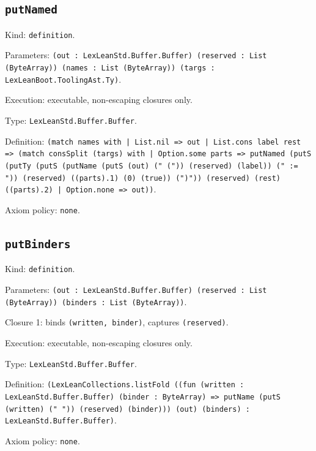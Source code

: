 \documentclass[11pt]{article}
\begin{document}
\subsection*{\texttt{putNamed}}
\noindent Kind: \texttt{definition}.\par
\noindent Parameters: \texttt{(out : LexLeanStd.Buffer.Buffer) (reserved : List (ByteArray)) (names : List (ByteArray)) (targs : LexLeanBoot.ToolingAst.Ty)}.\par
\noindent Execution: executable, non-escaping closures only.\par
\noindent Type: \texttt{LexLeanStd.Buffer.Buffer}.\par
\noindent Definition: \texttt{(match names with | List.nil => out | List.cons label rest => (match consSplit (targs) with | Option.some parts => putNamed (putS (putTy (putS (putName (putS (out) (" (")) (reserved) (label)) (" := ")) (reserved) ((parts).1) (0) (true)) (")")) (reserved) (rest) ((parts).2) | Option.none => out))}.\par
\noindent Axiom policy: \texttt{none}.\par
\subsection*{\texttt{putBinders}}
\noindent Kind: \texttt{definition}.\par
\noindent Parameters: \texttt{(out : LexLeanStd.Buffer.Buffer) (reserved : List (ByteArray)) (binders : List (ByteArray))}.\par
\noindent Closure 1: binds \texttt{(written, binder)}, captures \texttt{(reserved)}.\par
\noindent Execution: executable, non-escaping closures only.\par
\noindent Type: \texttt{LexLeanStd.Buffer.Buffer}.\par
\noindent Definition: \texttt{(LexLeanCollections.listFold ((fun (written : LexLeanStd.Buffer.Buffer) (binder : ByteArray) => putName (putS (written) (" ")) (reserved) (binder))) (out) (binders) : LexLeanStd.Buffer.Buffer)}.\par
\noindent Axiom policy: \texttt{none}.\par
\end{document}
